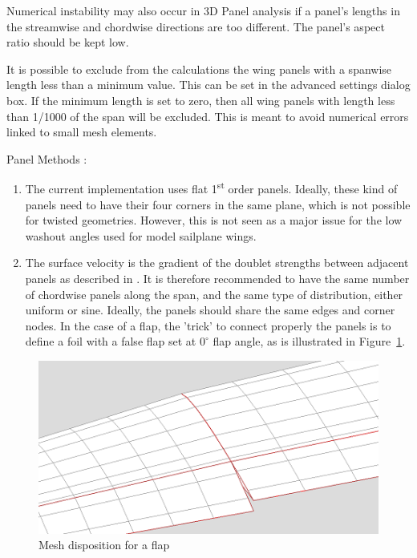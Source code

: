 \documentclass[a4paper,twoside,12pt,dvips]{article}
\begin{document}
Numerical instability may also occur in 3D Panel analysis if a panel's
lengths in the streamwise and chordwise directions are too
different. The panel's aspect ratio should be kept low.

It is possible to exclude from the calculations the wing panels with a
spanwise length less than a minimum value. This can be set in the
advanced settings dialog box. If the minimum length is set to zero,
then all wing panels with length less than 1/1000 of the span will be
excluded. This is meant to avoid numerical errors linked to small mesh
elements.

Panel Methods :

\begin{enumerate}
\item The current implementation uses flat 1\textsuperscript{st} order
panels.\newline 
Ideally, these kind of panels need to have their four corners in the
same plane, which is not possible for twisted geometries. However,
this is not seen as a major issue for the low washout angles used for
model sailplane wings.
\item The surface velocity is the gradient of the doublet strengths
between adjacent panels as described in \cite{Maskew}. It is therefore
recommended to have the same number of chordwise panels along the
span, and the same type of distribution, either uniform or
sine.\newline 
Ideally, the panels should share the same edges and corner nodes. In
the case of a flap, the 'trick' to connect properly the panels is to
define a foil with a false flap set at $0^\circ$ flap angle, as is
illustrated in Figure~\ref{fig:mesh_disposition_for_a_flap}.
\end{enumerate}

\begin{figure}[htbp]
  \includegraphics[width=0.8\linewidth]{img-11}\centering 
  \caption{Mesh disposition for a flap}
  \label{fig:mesh_disposition_for_a_flap}
\end{figure}
\end{document}
